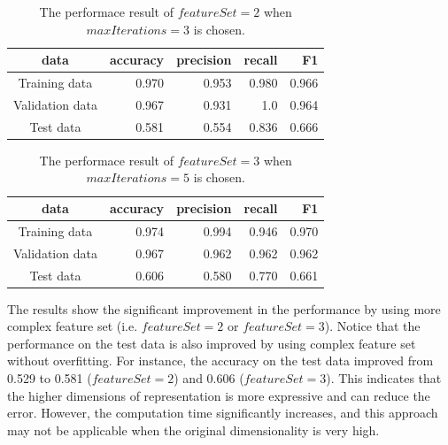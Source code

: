 \begin{table}[htb]
\centering
  \begin{tabular}{|c|r|r|r|r|} \hline
    data & accuracy & precision & recall & F1 \\ \hline
    Training data & 0.970 & 0.953 & 0.980 & 0.966 \\ \hline
    Validation data & 0.967 & 0.931 & 1.0 & 0.964 \\ \hline
    Test data & 0.581 & 0.554 & 0.836 & 0.666 \\ \hline
  \end{tabular}
  \caption{The performace result of $featureSet = 2$ when $maxIterations = 3$ is chosen.}
\end{table}

\begin{table}[htb]
\centering
  \begin{tabular}{|c|r|r|r|r|} \hline
    data & accuracy & precision & recall & F1 \\ \hline
    Training data & 0.974 & 0.994 & 0.946 & 0.970 \\ \hline
    Validation data & 0.967 & 0.962 & 0.962 & 0.962 \\ \hline
    Test data & 0.606 & 0.580 & 0.770 & 0.661 \\ \hline
  \end{tabular}
  \caption{The performace result of $featureSet = 3$ when $maxIterations = 5$ is chosen.}
\end{table}



The results show the significant improvement in the performance by using more complex feature set (i.e. $featureSet = 2$ or $featureSet = 3$). Notice that the performance on the test data is also improved by using complex feature set without overfitting. For instance, the accuracy on the test data improved from 0.529 to 0.581 ($featureSet=2$) and 0.606 ($featureSet=3$). This indicates that the higher dimensions of representation is more expressive and can reduce the error. However, the computation time significantly increases, and this approach may not be applicable when the original dimensionality is very high.



